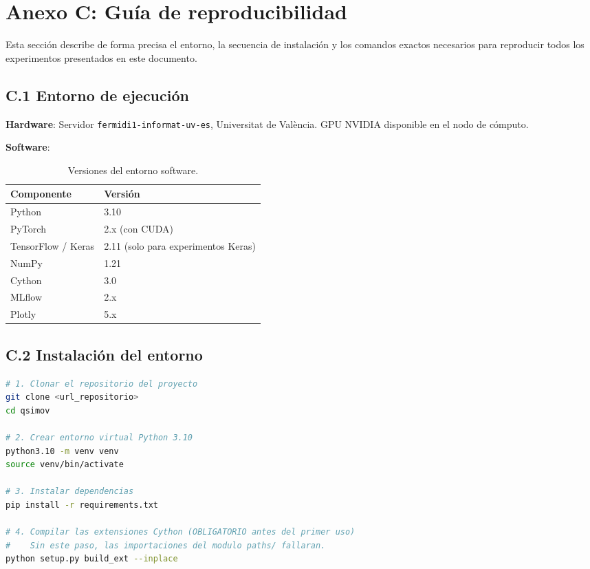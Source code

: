 \section{Anexo C: Guía de reproducibilidad}

Esta sección describe de forma precisa el entorno, la secuencia de instalación y los comandos
exactos necesarios para reproducir todos los experimentos presentados en este documento.

\subsection{C.1 Entorno de ejecución}

\textbf{Hardware}: Servidor \texttt{fermidi1-informat-uv-es}, Universitat de València. GPU NVIDIA
disponible en el nodo de cómputo.

\textbf{Software}:

\begin{table}[htbp]
  \centering
  \caption{Versiones del entorno software.}
  \label{tab:software}
  \begin{tabular}{ll}
    \toprule
    \textbf{Componente} & \textbf{Versión} \\
    \midrule
    Python              & 3.10 \\
    PyTorch             & 2.x (con CUDA) \\
    TensorFlow / Keras  & 2.11 (solo para experimentos Keras) \\
    NumPy               & 1.21 \\
    Cython              & 3.0 \\
    MLflow              & 2.x \\
    Plotly              & 5.x \\
    \bottomrule
  \end{tabular}
\end{table}

\subsection{C.2 Instalación del entorno}

\begin{lstlisting}[language=bash, caption={Configuración del entorno desde cero.}]
# 1. Clonar el repositorio del proyecto
git clone <url_repositorio>
cd qsimov

# 2. Crear entorno virtual Python 3.10
python3.10 -m venv venv
source venv/bin/activate

# 3. Instalar dependencias
pip install -r requirements.txt

# 4. Compilar las extensiones Cython (OBLIGATORIO antes del primer uso)
#    Sin este paso, las importaciones del modulo paths/ fallaran.
python setup.py build_ext --inplace
\end{lstlisting}

